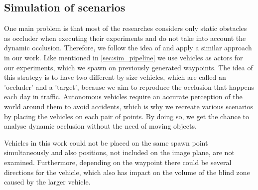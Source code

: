 \subsection{Simulation of scenarios} \label{sec:sim_stage}
One main problem is that most of the researches considers only static obstacles as occluder when executing their experiments and do not take into account the dynamic occlusion. Therefore, we follow the idea of \cite{occlusion_degree_model} and apply a similar approach in our work. Like mentioned in \ref{sec:sim_pipeline} we use vehicles as actors for our experiments, which we spawn on previously generated waypoints. The idea of this strategy is to have two different by size vehicles, which are called an 'occluder' and a 'target', because we aim to reproduce the occlusion that happens each day in traffic. Autonomous vehicles require an accurate perception of the world around them to avoid accidents, which is why we recreate various scenarios by placing the vehicles on each pair of points. By doing so, we get the chance to analyse dynamic occlusion without the need of moving objects.

Vehicles in this work could not be placed on the same spawn point simultaneously and also positions, not included on the image plane, are not examined. Furthermore, depending on the waypoint there could be several directions for the vehicle, which also has impact on the volume of the blind zone caused by the larger vehicle. 

